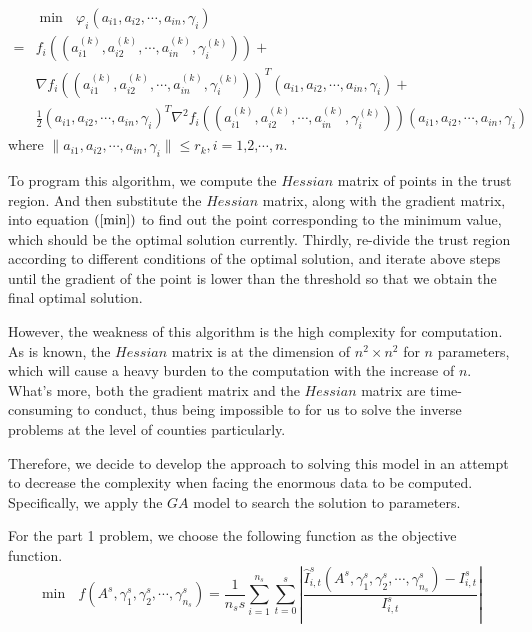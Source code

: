 \begin{equation}
\begin{aligned}\label{min}
&\min\text{ }\varphi _i\left( a_{i1},a_{i2},\cdots ,a_{in},\gamma _i \right)\\
=&f_i\left( \left( a_{i1}^{\left( k \right)},a_{i2}^{\left( k \right)},\cdots ,a_{in}^{\left( k \right)},\gamma _{i}^{\left( k \right)} \right) \right)+  
\\
&\nabla f_i\left( \left( a_{i1}^{\left( k \right)},a_{i2}^{\left( k \right)},\cdots ,a_{in}^{\left( k \right)},\gamma _{i}^{\left( k \right)} \right) \right) ^T\left( a_{i1},a_{i2},\cdots ,a_{in},\gamma _i \right)+ 
\\
&\frac{1}{2}\left( a_{i1},a_{i2},\cdots ,a_{in},\gamma _i \right) ^T\nabla ^2f_i\left( \left( a_{i1}^{\left( k \right)},a_{i2}^{\left( k \right)},\cdots ,a_{in}^{\left( k \right)},\gamma _{i}^{\left( k \right)} \right) \right) \left( a_{i1},a_{i2},\cdots ,a_{in},\gamma _i \right)
\end{aligned}
\end{equation}
where $\lVert a_{i1},a_{i2},\cdots ,a_{in},\gamma _i \rVert \leqslant r_k, i=\text{1,2,}\cdots ,n$.

To program this algorithm, we compute the $Hessian$ matrix of points in the trust region. And then substitute the $Hessian$ matrix, along with the gradient matrix, into equation $\left(\ref{min}\right)$ to find out the point corresponding to the minimum value, which should be the optimal solution currently. Thirdly, re-divide the trust region according to different conditions of the optimal solution, and iterate above steps until the gradient of the point is lower than the threshold so that we obtain the final optimal solution.

However, the weakness of this algorithm is the high complexity for computation. As is known, the $Hessian$ matrix is at the dimension of $n^2\times n^2$ for $n$ parameters, which will cause a heavy burden to the computation with the increase of $n$. What’s more, both the gradient matrix and the $Hessian$ matrix are time-consuming to conduct, thus being impossible to for us to solve the inverse problems at the level of counties particularly.

Therefore, we decide to develop the approach to solving this model in an attempt to decrease the complexity when facing the enormous data to be computed. Specifically, we apply the $GA$ model to search the solution to parameters.

For the part 1 problem, we choose the following function as the objective function.
\begin{equation}
\min\text{ }f\left( A^s,\gamma _{1}^{s},\gamma _{2}^{s},\cdots ,\gamma _{n_s}^{s} \right) =\frac{1}{n_ss}\sum_{i=1}^{n_s}{\sum_{t=0}^s{\left| \frac{\widehat{I}_{i,t}^{s}\left( A^s,\gamma _{1}^{s},\gamma _{2}^{s},\cdots ,\gamma _{n_s}^{s} \right) -I_{i,t}^{s}}{I_{i,t}^{s}} \right|}}
\end{equation}

